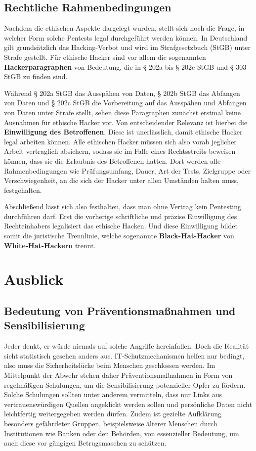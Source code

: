 \documentclass[12pt, a4paper, oneside]{scrartcl}
\begin{document}
\subsection{Rechtliche Rahmenbedingungen}
Nachdem die ethischen Aspekte dargelegt wurden, stellt sich noch die Frage, in welcher Form solche 
Pentests legal durchgeführt werden können. In Deutschland gilt grundsätzlich das Hacking-Verbot und wird 
im Strafgesetzbuch (StGB) unter Strafe gestellt. Für ethische Hacker sind vor allem die  
sogenannten \textbf{Hackerparagraphen} von Bedeutung, die in § 202a bis § 202c StGB und § 303 StGB zu finden sind.
\par
Während § 202a StGB das Ausspähen von Daten, § 202b StGB das Abfangen von Daten und § 202c StGB 
die Vorbereitung auf das Ausspähen und Abfangen von Daten unter Strafe stellt, sehen diese Paragraphen
zunächst erstmal keine Ausnahmen für ethische Hacker vor. Von entscheidender Relevanz ist hierbei 
die \textbf{Einwilligung des Betroffenen}. Diese ist unerlässlich, damit ethische Hacker legal arbeiten können.
Alle ethischen Hacker müssen sich also vorab jeglicher Arbeit vertraglich absichern, sodass sie im 
Falle eines Rechtsstreits beweisen können, dass sie die Erlaubnis des Betroffenen hatten. Dort werden alle
Rahmenbedingungen wie Prüfungsumfang, Dauer, Art der Tests, Zielgruppe oder Verschwiegenheit, an die sich der Hacker 
unter allen Umständen halten muss, festgehalten.
\par
Abschließend lässt sich also festhalten, dass man ohne Vertrag kein Pentesting durchführen darf. Erst die vorherige
schriftliche und präzise Einwilligung des Rechteinhabers legalisiert das ethische Hacken. Und diese Einwilligung
bildet somit die juristische Trennlinie, welche sogenannte \textbf{Black-Hat-Hacker} von \textbf{White-Hat-Hackern} trennt.\\


\section{Ausblick}

\subsection{Bedeutung von Präventionsmaßnahmen und Sensibilisierung}
Jeder denkt, er würde niemals auf solche Angriffe hereinfallen. Doch die Realität sieht statistisch gesehen
anders aus. IT-Schutzmechanismen helfen nur bedingt, also muss die Sicherheitslücke beim Menschen
geschlossen werden. Im Mittelpunkt der Abwehr stehen daher Präventionsmaßnahmen in Form von regelmäßigen Schulungen,
um die Sensibilisierung potenzieller Opfer zu fördern.
Solche Schulungen sollten unter anderem vermitteln, dass nur Links aus vertrauenswürdigen Quellen angeklickt werden sollen 
und persönliche Daten nicht leichtfertig weitergegeben werden dürfen. Zudem ist gezielte Aufklärung besonders gefährdeter Gruppen, 
beispielsweise älterer Menschen durch Institutionen wie Banken oder den Behörden, von essenzieller Bedeutung, um auch diese vor 
gängigen Betrugsmaschen zu schützen.
\end{document}

